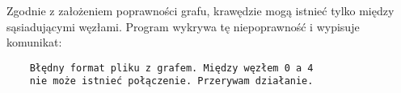 \documentclass[]{article}
\begin{document}
\begin{enumerate}
\begin{figure}[!h]
\end{figure}
\newline
Zgodnie z założeniem poprawności grafu, krawędzie mogą istnieć tylko między sąsiadującymi węzłami. Program wykrywa tę niepoprawność i wypisuje komunikat:
\begin{verbatim}
    Błędny format pliku z grafem. Między węzłem 0 a 4 
    nie może istnieć połączenie. Przerywam działanie.
\end{verbatim}

\end{enumerate}
\end{document}
